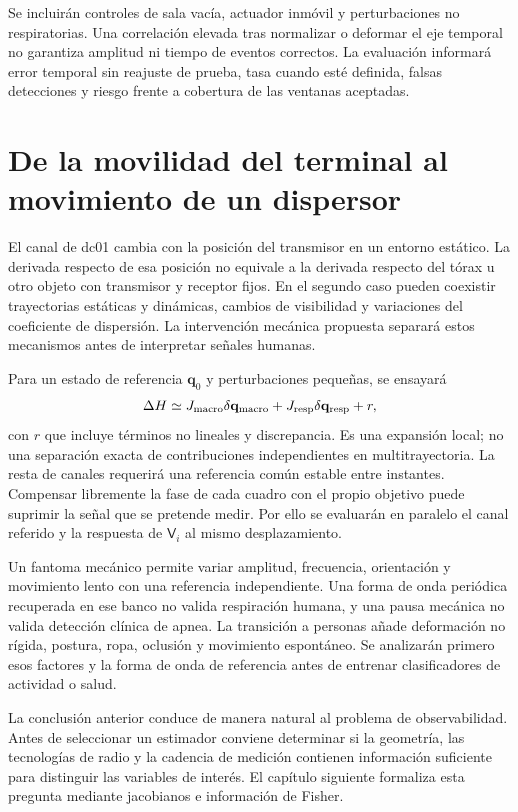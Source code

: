 Se incluirán controles de sala vacía, actuador inmóvil y perturbaciones no
respiratorias. Una correlación elevada tras normalizar o deformar el eje temporal
no garantiza amplitud ni tiempo de eventos correctos. La evaluación informará
error temporal sin reajuste de prueba, tasa cuando esté definida, falsas detecciones
y riesgo frente a cobertura de las ventanas aceptadas.

\section{De la movilidad del terminal al movimiento de un dispersor}
\label{sec:motion_intervention}

El canal de dc01 cambia con la posición del transmisor en un entorno estático.
La derivada respecto de esa posición no equivale a la derivada respecto del tórax
u otro objeto con transmisor y receptor fijos. En el segundo caso pueden coexistir
trayectorias estáticas y dinámicas, cambios de visibilidad y variaciones del coeficiente
de dispersión. La intervención mecánica propuesta separará estos mecanismos antes
de interpretar señales humanas.

Para un estado de referencia $\mathbf q_0$ y perturbaciones pequeñas, se ensayará
\begin{equation}
\Delta H\simeq J_{\rm macro}\delta\mathbf q_{\rm macro}
+J_{\rm resp}\delta\mathbf q_{\rm resp}+r,
\label{eq:local_motion_decomposition}
\end{equation}
con $r$ que incluye términos no lineales y discrepancia. Es una expansión local;
no una separación exacta de contribuciones independientes en multitrayectoria.
La resta de canales requerirá una referencia común estable entre instantes.
Compensar libremente la fase de cada cuadro con el propio objetivo puede suprimir
la señal que se pretende medir. Por ello se evaluarán en paralelo el canal referido
y la respuesta de $\mathsf V_i$ al mismo desplazamiento.

Un fantoma mecánico permite variar amplitud, frecuencia, orientación y movimiento
lento con una referencia independiente. Una forma de onda periódica recuperada en
ese banco no valida respiración humana, y una pausa mecánica no valida detección
clínica de apnea. La transición a personas añade deformación no rígida, postura,
ropa, oclusión y movimiento espontáneo. Se analizarán primero esos factores y la
forma de onda de referencia antes de entrenar clasificadores de actividad o salud.

La conclusión anterior conduce de manera natural al problema de observabilidad. Antes de
seleccionar un estimador conviene determinar si la geometría, las tecnologías de radio y la
cadencia de medición contienen información suficiente para distinguir las variables de
interés. El capítulo siguiente formaliza esta pregunta mediante jacobianos e información
de Fisher.
